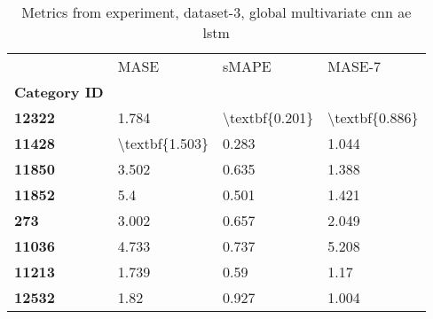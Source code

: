 \begin{table}[h]
\centering
\caption{Metrics from experiment, dataset-3, global multivariate cnn ae lstm}
\label{table:global-multivariate-cnn-ae-lstm-dataset-3}
\begin{tabular}{llll}
\toprule
{} &            MASE &           sMAPE &          MASE-7 \\
\textbf{Category ID} &                 &                 &                 \\
\midrule
\textbf{12322      } &           1.784 &  \textbackslash textbf\{0.201\} &  \textbackslash textbf\{0.886\} \\
\textbf{11428      } &  \textbackslash textbf\{1.503\} &           0.283 &           1.044 \\
\textbf{11850      } &           3.502 &           0.635 &           1.388 \\
\textbf{11852      } &             5.4 &           0.501 &           1.421 \\
\textbf{273        } &           3.002 &           0.657 &           2.049 \\
\textbf{11036      } &           4.733 &           0.737 &           5.208 \\
\textbf{11213      } &           1.739 &            0.59 &            1.17 \\
\textbf{12532      } &            1.82 &           0.927 &           1.004 \\
\bottomrule
\end{tabular}
\end{table}
